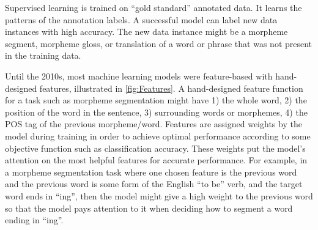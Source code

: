 



Supervised learning is trained on ``gold standard'' annotated data. It learns the patterns of the annotation labels. A successful model can label new data instances with high accuracy. The new data instance might be a morpheme segment, morpheme gloss, or translation of a word or phrase that was not present in the training data. 



Until the 2010s, most machine learning models were feature-based with hand-designed features, illustrated in \autoref{fig:Features}. 
A hand-designed feature function for a task such as morpheme segmentation might have 1) the whole word, 2) the position of the word in the sentence, 3) surrounding words or morphemes, 4) the POS tag of the previous morpheme/word. Features are assigned weights by the model during training in order to achieve optimal performance according to some objective function such as classification accuracy. These weights put the model's attention on the most helpful features for accurate performance. For example, in a morpheme segmentation task where one chosen feature is the previous word and the previous word is some form of the English ``to be'' verb, and the target word ends in ``ing'', then the model might give a high weight to the previous word so that the model pays attention to it when deciding how to segment a word ending in ``ing''. 

